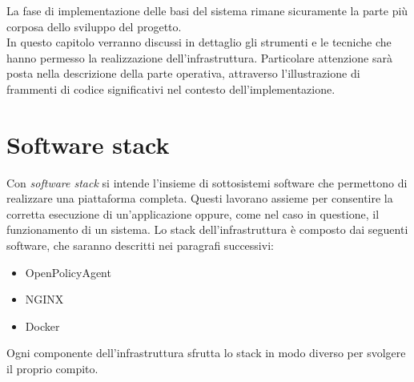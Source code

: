 La fase di implementazione delle basi del sistema rimane sicuramente la parte più corposa dello sviluppo del progetto.
\\ In questo capitolo verranno discussi in dettaglio gli strumenti e le tecniche
che hanno permesso la realizzazione dell'infrastruttura. Particolare attenzione sarà posta nella descrizione 
della parte operativa, attraverso l'illustrazione di frammenti di codice significativi nel contesto dell'implementazione. 

\section{Software stack}
Con \textit{software stack} si intende l'insieme di sottosistemi software che permettono di realizzare una piattaforma completa.
Questi lavorano assieme per consentire la corretta esecuzione di un'applicazione oppure, come nel caso in questione, il 
funzionamento di un sistema.   
Lo stack dell'infrastruttura è composto dai seguenti software, che saranno descritti nei paragrafi successivi:
\begin{itemize}
    \item OpenPolicyAgent
    \item NGINX
    \item Docker
\end{itemize}
Ogni componente dell'infrastruttura sfrutta lo stack in modo diverso per svolgere il proprio compito. 


